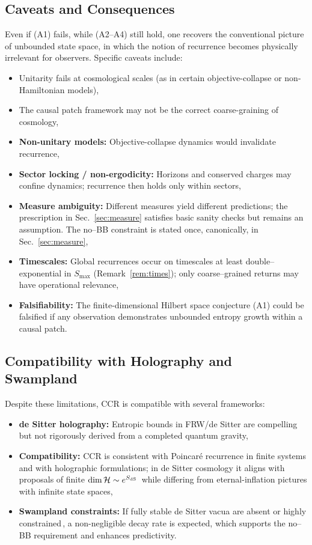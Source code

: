 \documentclass[12pt]{article}
\newcommand{\Smax}{S_{\max}}
\theoremstyle{remark}
\begin{document}
\subsection{Caveats and Consequences}
Even if (A1) fails, while (A2--A4) still hold, one recovers the conventional picture of unbounded state space,
in which the notion of recurrence becomes physically irrelevant for observers. Specific caveats include:
\begin{itemize}
  \item Unitarity fails at cosmological scales (as in certain objective-collapse or non-Hamiltonian models),
  \item The causal patch framework may not be the correct coarse-graining of cosmology,
  \item \textbf{Non-unitary models:} Objective-collapse dynamics would invalidate recurrence,
  \item \textbf{Sector locking / non-ergodicity:} Horizons and conserved charges may confine dynamics;
        recurrence then holds only within sectors,
  \item \textbf{Measure ambiguity:} Different measures yield different predictions;
        the prescription in Sec.~\ref{sec:measure} satisfies basic sanity checks but remains an assumption.
        The no--BB constraint is stated once, canonically, in Sec.~\ref{sec:measure},
  \item \textbf{Timescales:} Global recurrences occur on timescales at least double--exponential in $\Smax$ (Remark~\ref{rem:times});
        only coarse--grained returns may have operational relevance,
  \item \textbf{Falsifiability:} The finite-dimensional Hilbert space conjecture (A1) could be falsified if any observation
        demonstrates unbounded entropy growth within a causal patch.
\end{itemize}

\subsection{Compatibility with Holography and Swampland}
Despite these limitations, CCR is compatible with several frameworks:
\begin{itemize}
  \item \textbf{de Sitter holography:} Entropic bounds in FRW/de Sitter are compelling but not rigorously derived
        from a completed quantum gravity,
  \item \textbf{Compatibility:} CCR is consistent with Poincar\'e recurrence in finite systems and with holographic formulations;
        in de Sitter cosmology it aligns with proposals of finite $\dim\mathcal H \sim e^{S_{\rm dS}}$\,\cite{BanksFischler2001,BanksFischler2003}
        while differing from eternal-inflation pictures with infinite state spaces,
  \item \textbf{Swampland constraints:} If fully stable de Sitter vacua are absent or highly constrained\,\cite{Obied2018,Ooguri2019},
        a non-negligible decay rate is expected, which supports the no--BB requirement and enhances predictivity.
\end{itemize}
\end{document}

